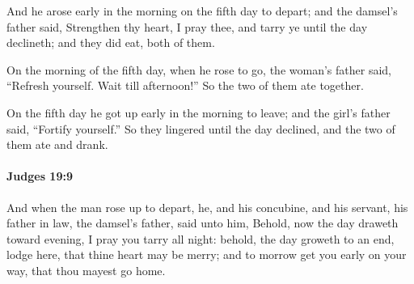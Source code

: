 			\begin{versebox}
					\item[BHS] 
					\item[ASV] And he arose early in the morning on the fifth day to depart; and the damsel's father said, Strengthen thy heart, I pray thee, and tarry ye until the day declineth; and they did eat, both of them.
					\item[NIV] On the morning of the fifth day, when he rose to go, the woman’s father said, “Refresh yourself. Wait till afternoon!” So the two of them ate together.
					\item[NRSV] On the fifth day he got up early in the morning to leave; and the girl’s father said, “Fortify yourself.” So they lingered until the day declined, and the two of them ate and drank.
			\end{versebox}

		\paragraph{Judges 19:9} %
			\label{JUDGES-19-9}

			And when the man rose up to depart, he, and his concubine, and his servant, his father in law, the damsel’s father, said unto him, Behold, now the day draweth toward evening, I pray you tarry all night: behold, the day groweth to an end, lodge here, that thine heart may be merry; and to morrow get you early on your way, that thou mayest go home.

